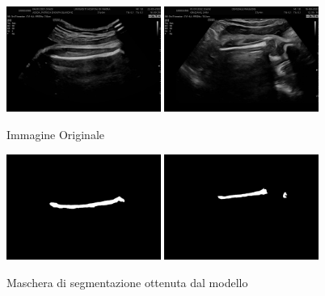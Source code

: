 \begin{figure}[!ht]
    \centering
    \includegraphics[width=0.45\textwidth]{./Immagini/nuovo_ecografo_results/0_image.png}
    \includegraphics[width=0.45\textwidth]{./Immagini/nuovo_ecografo_results/3_image.png}
    \caption{Immagine Originale}
    \label{fig:immagine_originale}
\end{figure}

\begin{figure}[!ht]
    \centering
    \includegraphics[width=0.45\textwidth]{./Immagini/nuovo_ecografo_results/0_mask.png}
    \includegraphics[width=0.45\textwidth]{./Immagini/nuovo_ecografo_results/3_mask.png}
    \caption{Maschera di segmentazione ottenuta dal modello}
    \label{fig:maschera}
\end{figure}

